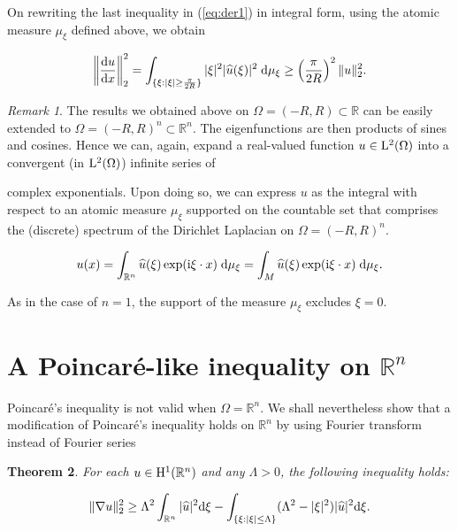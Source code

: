 \documentclass{amsart}
\newtheorem {Theorem}  {Theorem}
\numberwithin{Theorem}{section}
\numberwithin{equation}{section}
\theoremstyle{definition}
\theoremstyle{remark}
\newtheorem{Remark}[Theorem]{Remark}
\begin{document}
On rewriting the last inequality in (\ref{eq:der1}) in integral form, using the atomic measure $\mu_{\xi}$
defined above, we obtain

\begin{eqnarray}\label{eq1}
\left\|\frac{{\rm d}u}{{\rm d}x}\right\|_2^2 = \int_{\{\xi:|\xi| \geq \frac{\pi}{2R}\} }|\xi|^2| \widehat{u}(\xi)|^2\; {\rm d} \mu_{\xi}
\geq  \left(\frac{\pi}{2R}\right)^2\|u\|_2^2.
\end{eqnarray}

\bigskip

\begin{Remark} The results we obtained above on $\Omega =(-R,R) \subset \mathbb{R}$ can be easily extended to
$\Omega =(-R,R)^n \subset \mathbb{R}^n$. The eigenfunctions are then products of sines and cosines. Hence we can, again, expand a real-valued function $u \in {{\rm L}}^2(\Omega)$ into
a convergent (in ${{\rm L}}^2(\Omega)$) infinite series of

complex exponentials. Upon doing so, we can express $u$ as the integral with respect to an atomic measure $\mu_\xi$ supported on the countable set that comprises the (discrete) spectrum of the Dirichlet Laplacian on $\Omega=(-R,R)^n$.

\begin{equation} \label{eq: sol1}
u(x) = \int_{{\mathbb R}^n} \widehat{u}(\xi) \exp({\rm i} \xi \cdot x ) \; {\rm d}\mu_{\xi}  = \int_{M} \widehat{u}(\xi) \exp({\rm i} \xi \cdot x ) \; {\rm d} \mu_{\xi}.
\end{equation}

As in the case of $n=1$, the support of the measure $\mu_\xi$ excludes $\xi=0$.\end{Remark}

\section{A Poincar\'{e}-like inequality on $\mathbb{R}^n$}

Poincar\'e's inequality is not valid when $\Omega = \mathbb{R}^n$. We shall nevertheless show that a modification of Poincar\'e's inequality holds on $\mathbb{R}^n$ by using Fourier transform instead of Fourier series

\begin{Theorem} \label{theo:UP} For each $u\in {{\rm H}}^1({{\mathbb R}^n})$ and any $\Lambda>0$, the following inequality holds:

\[\|\nabla u\|_2^2 \geq \Lambda^{2} \int_{\mathbb{R}^n} |\widehat{u}|^2 {\rm d}\xi  -  \int_{\{\xi:|\xi|\leq \Lambda\}} (\Lambda^2 - |\xi|^2) |\widehat{u}|^2 {\rm d}\xi.
\]

\end{Theorem}
\end{document}
